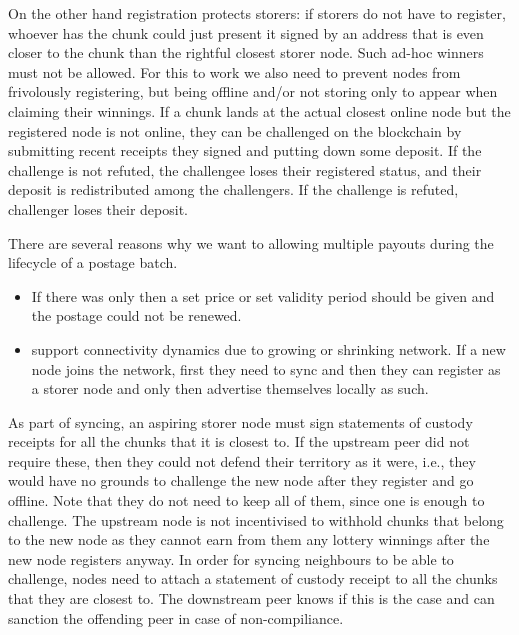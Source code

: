 On the other hand registration protects storers: if storers do not have to register, whoever has the chunk could just present it signed by an address that is even closer to the chunk than the rightful closest storer node. Such ad-hoc winners must not be allowed. For this to work we also need to prevent nodes from frivolously registering, but being offline and/or not storing only to appear when claiming their winnings.  If a chunk lands at the actual closest online node but the registered node is not online, they can be challenged on the blockchain by submitting recent receipts they signed and putting down some deposit. If the challenge is not refuted, the challengee loses their registered status, and their deposit is redistributed among the challengers. If the challenge is refuted, challenger loses their deposit. 



There are several reasons why we want to allowing multiple payouts during the  lifecycle of a postage batch. 

\begin{itemize}
    \item If there was only then a set price or set validity period should be given and the postage could not be renewed. 
\item support connectivity dynamics due to growing or shrinking network. If a new node joins the network, first they need to sync and then they can register as a storer node and only then advertise themselves locally as such.
\end{itemize}

As part of syncing, an aspiring storer node must sign statements of custody receipts for all the chunks that it is closest to. If the upstream peer did not require these, then they could not defend their territory as it were, i.e., they would have no grounds to challenge the new node after they register and go offline. Note that they do not need to keep all of them, since one is enough to challenge. The upstream node is not incentivised to withhold chunks that belong to the new node as they cannot earn from them any lottery winnings after the new node registers anyway. In  order for syncing neighbours to be able to challenge, nodes  need to attach a statement of custody receipt to all the chunks that they are closest to. The downstream peer knows if this is the case and can sanction the offending peer in case of non-compiliance.  






